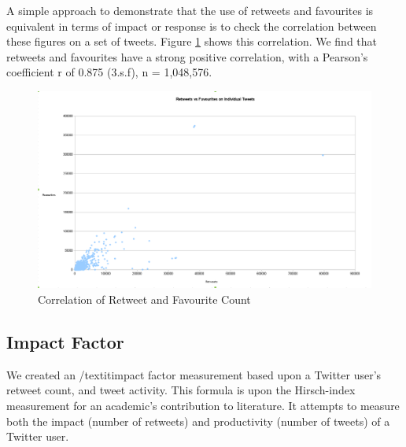 
A simple approach to demonstrate that the use of retweets and favourites is equivalent in terms of impact or response is to check the correlation between these figures on a set of tweets. Figure \ref{fig:correlation_retweet_fav} shows this correlation. We find that retweets and favourites have a strong positive correlation, with a Pearson's coefficient r of 0.875 (3.s.f), n = 1,048,576. 

\begin{figure}[h!]
\begin{center}
 \centering
\includegraphics[width=500px]{Images/retweets_vs_favourites.pdf}
\caption{Correlation of Retweet and Favourite Count}
\label{fig:correlation_retweet_fav}
\end{center}
\end{figure}


\subsection{Impact Factor}

We created an /textit{impact factor} measurement based upon a Twitter user's retweet count, and tweet activity. This formula is upon the Hirsch-index \cite{hirsch2005index} measurement for an academic's contribution to literature. It attempts to measure both the impact (number of retweets) and productivity (number of tweets) of a Twitter user. 

